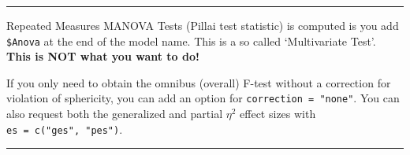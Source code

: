 \documentclass[]{article}
\newenvironment{Shaded}{\begin{snugshade}}{\end{snugshade}}
\newcommand{\KeywordTok}[1]{\textcolor[rgb]{0.13,0.29,0.53}{\textbf{#1}}}
\newcommand{\DataTypeTok}[1]{\textcolor[rgb]{0.13,0.29,0.53}{#1}}
\newcommand{\DecValTok}[1]{\textcolor[rgb]{0.00,0.00,0.81}{#1}}
\newcommand{\StringTok}[1]{\textcolor[rgb]{0.31,0.60,0.02}{#1}}
\newcommand{\CommentTok}[1]{\textcolor[rgb]{0.56,0.35,0.01}{\textit{#1}}}
\newcommand{\OperatorTok}[1]{\textcolor[rgb]{0.81,0.36,0.00}{\textbf{#1}}}
\newcommand{\NormalTok}[1]{#1}
\begin{document}
\begin{Shaded}
\end{Shaded}

\begin{center}\rule{0.5\linewidth}{\linethickness}\end{center}

Repeated Measures MANOVA Tests (Pillai test statistic) is computed is
you add \texttt{\$Anova} at the end of the model name. This is a so
called `Multivariate Test'. \textbf{This is NOT what you want to do!}

\begin{Shaded}
\end{Shaded}

\clearpage

If you only need to obtain the omnibus (overall) F-test without a
correction for violation of sphericity, you can add an option for
\texttt{correction\ =\ "none"}. You can also request both the
generalized and partial \(\eta^2\) effect sizes with
\texttt{es\ =\ c("ges",\ "pes")}.

\begin{Shaded}
\end{Shaded}

\begin{center}\rule{0.5\linewidth}{\linethickness}\end{center}
\end{document}
